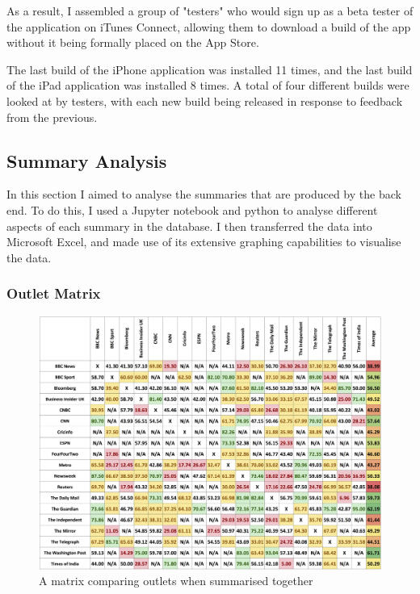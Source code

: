 \documentclass[12pt]{article}
\begin{document}
As a result, I assembled a group of "testers" who would sign up as a beta tester of the application on iTunes Connect, allowing them to download a build of the app without it being formally placed on the App Store.

The last build of the iPhone application was installed 11 times, and the last build of the iPad application was installed 8 times. A total of four different builds were looked at by testers, with each new build being released in response to feedback from the previous.   

\subsection{Summary Analysis}

In this section I aimed to analyse the summaries that are produced by the back end. To do this, I used a Jupyter notebook and python to analyse different aspects of each summary in the database. I then transferred the data into Microsoft Excel, and made use of its extensive graphing capabilities to visualise the data.

\subsubsection{Outlet Matrix}

\begin{figure}
    \centering
    \includegraphics[width=\textwidth]{matrix.png}
    \caption{A matrix comparing outlets when summarised together}
    \label{fig:matrix}
\end{figure}
\end{document}

